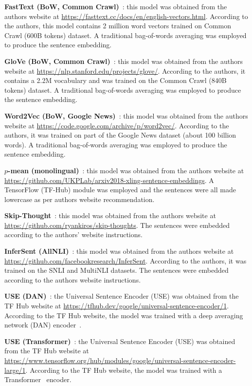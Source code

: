 \documentclass{article}
\begin{document}
\textbf{FastText (BoW, Common Crawl)}~\cite{bojanowski2016enriching}: this model was obtained from the authors website at \url{https://fasttext.cc/docs/en/english-vectors.html}. According to the authors, this model contains 2 million word vectors trained on Common Crawl (600B tokens) dataset. A traditional bag-of-words averaging was employed to produce the sentence embedding.

\textbf{GloVe (BoW, Common Crawl)}~\cite{pennington2014glove}: this model was obtained from the authors website at \url{https://nlp.stanford.edu/projects/glove/}. According to the authors, it contains a 2.2M vocabulary and was trained on the Common Crawl (840B tokens) dataset. A traditional bag-of-words averaging was employed to produce the sentence embedding.

\textbf{Word2Vec (BoW, Google News)}~\cite{mikolov2013distributed}: this model was obtained from the authors website at \url{https://code.google.com/archive/p/word2vec/}. According to the authors, it was trained on part of the Google News dataset (about 100 billion words). A traditional bag-of-words averaging was employed to produce the sentence embedding.

\textbf{$p$-mean (monolingual)}~\cite{DBLP:journals/corr/abs-1803-01400}: this model was obtained from the authors website at \url{https://github.com/UKPLab/arxiv2018-xling-sentence-embeddings}. A TensorFlow (TF-Hub) module was employed and the sentences were all made lowercase as per authors website recommendation.

\textbf{Skip-Thought}~\cite{kiros2015skip}: this model was obtained from the authors website at \url{https://github.com/ryankiros/skip-thoughts}. The sentences were embedded according to the authors' website instructions.

\textbf{InferSent (AllNLI)}~\cite{conneau2017supervised}: this model was obtained from the authors website at \url{https://github.com/facebookresearch/InferSent}. According to the authors, it was trained on the SNLI and MultiNLI datasets. The sentences were embedded according to the authors website instructions.

\textbf{USE (DAN)}~\cite{DBLP:journals/corr/abs-1803-11175}: the Universal Sentence Encoder (USE) was obtained from the TF Hub website at \url{https://tfhub.dev/google/universal-sentence-encoder/1}. According to the TF Hub website, the model was trained with a deep averaging network (DAN) encoder~\cite{iyyer2015deep}.


\textbf{USE (Transformer)}~\cite{DBLP:journals/corr/abs-1803-11175}: the Universal Sentence Encoder (USE) was obtained from the TF Hub website at \url{https://www.tensorflow.org/hub/modules/google/universal-sentence-encoder-large/1}. According to the TF Hub website, the model was trained with a Transformer~\cite{vaswani2017attention} encoder.
\end{document}
